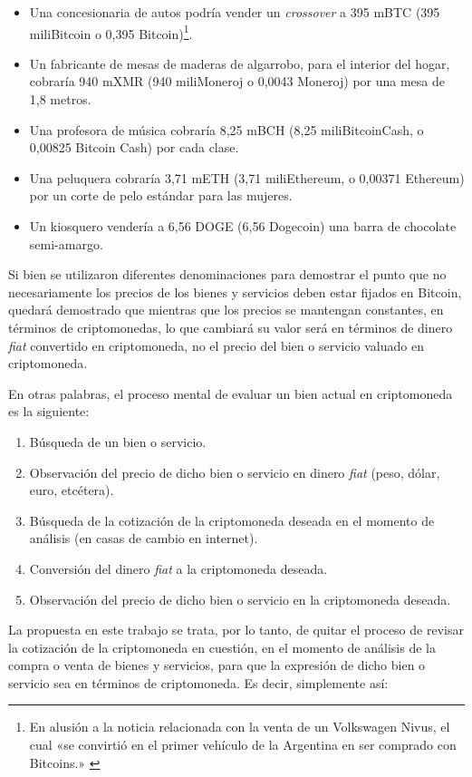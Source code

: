 \documentclass[12pt,a4paper,twoside]{book}
\begin{document}
\begin{itemize}
\item Una concesionaria de autos podría vender un \textit{crossover} a 395 mBTC (395 miliBitcoin o 0,395 Bitcoin)\footnote{En alusión a la noticia relacionada con la venta de un Volkswagen Nivus, el cual «se convirtió en el primer vehículo de la Argentina en ser comprado con Bitcoins.» \cite{infobae:auto0kmbitcoin}}.
\item Un fabricante de mesas de maderas de algarrobo, para el interior del hogar, cobraría 940 mXMR (940 miliMoneroj o 0,0043 Moneroj) por una mesa de 1,8 metros.
\item Una profesora de música cobraría 8,25 mBCH (8,25 miliBitcoinCash, o 0,00825 Bitcoin Cash) por cada clase.
\item Una peluquera cobraría 3,71 mETH (3,71 miliEthereum, o 0,00371 Ethereum) por un corte de pelo estándar para las mujeres.
\item Un kiosquero vendería a 6,56 DOGE (6,56 Dogecoin) una barra de chocolate semi-amargo.
\end{itemize}

Si bien se utilizaron diferentes denominaciones para demostrar el punto que no necesariamente los precios de los bienes y servicios deben estar fijados en Bitcoin, quedará demostrado que mientras que los precios se mantengan constantes, en términos de criptomonedas, lo que cambiará su valor será en términos de dinero \textit{fiat} convertido en criptomoneda, no el precio del bien o servicio valuado en criptomoneda.

En otras palabras, el proceso mental de evaluar un bien actual en criptomoneda es la siguiente:

\begin{enumerate}
\item Búsqueda de un bien o servicio.
\item Observación del precio de dicho bien o servicio en dinero \textit{fiat} (peso, dólar, euro, etcétera).
\item Búsqueda de la cotización de la criptomoneda deseada en el momento de análisis (en casas de cambio en internet).
\item Conversión del dinero \textit{fiat} a la criptomoneda deseada.
\item Observación del precio de dicho bien o servicio en la criptomoneda deseada.
\end{enumerate}

La propuesta en este trabajo se trata, por lo tanto, de quitar el proceso de revisar la cotización de la criptomoneda en cuestión, en el momento de análisis de la compra o venta de bienes y servicios, para que la expresión de dicho bien o servicio sea en términos de criptomoneda. Es decir, simplemente así:
\end{document}
